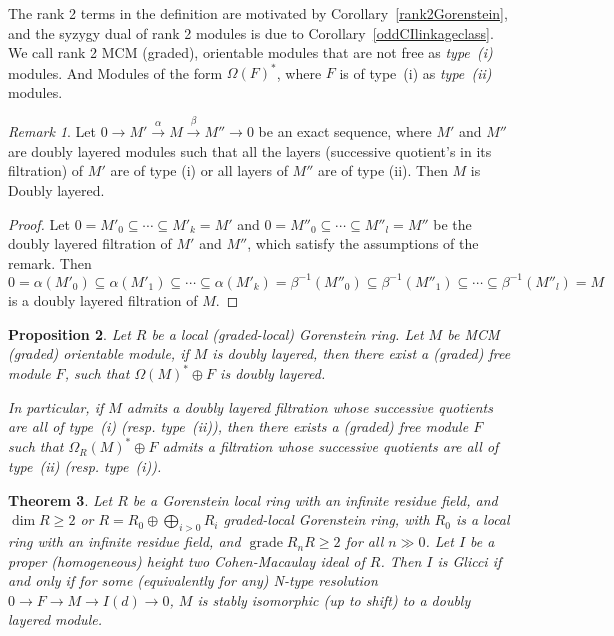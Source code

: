 \documentclass[11pt,letterpaper]{amsart}
\newcommand{\seq}{\subseteq}
\newcommand{\x}{\xrightarrow{}}
\DeclareMathOperator{\gr}{grade}
\theoremstyle{plain}
\newtheorem{thm}{Theorem}[section]
\newtheorem{prop}[thm]{Proposition}
\theoremstyle{definition}
\theoremstyle{remark}
\newtheorem{remark}[thm]{Remark}
\begin{document}
The rank 2 terms in the definition are motivated by Corollary~\ref{rank2Gorenstein}, and the syzygy dual of rank 2 modules is due to Corollary~\ref{oddCIlinkageclass}. We call rank 2 MCM (graded), orientable modules that are not free as \emph{type~(i)} modules. And Modules of the form $\Omega(F)^*$, where $F$ is of type~(i) as \emph{type~(ii)} modules. 

\begin{remark}

    Let $0\xrightarrow{} M'\xrightarrow{\alpha} M\xrightarrow{\beta} M''\x 0$ be an exact sequence, where $M'$ and $M''$ are doubly layered modules such that all the layers (successive quotient's in its filtration) of $M'$ are of type (i) or all layers of $M''$ are of type (ii). Then $M$ is Doubly layered.

\end{remark} 
\begin{proof} Let $0=M'_0\seq\cdots\seq M'_k=M'$ and $0=M''_0\seq\cdots\seq M''_l=M''$ be the doubly layered filtration of $M'$ and $M''$, which satisfy the assumptions of the remark. Then $$0=\alpha(M'_0)\seq \alpha(M'_1)\seq\cdots\seq \alpha(M'_k)=\beta^{-1}(M''_0)\seq \beta^{-1}(M''_1)\seq\cdots\seq\beta^{-1}(M''_l)=M$$ is a doubly layered filtration of $M$.
\end{proof}


\begin{prop}\cite[Proposition~4.5]{CasanellasDrozdHartshorne+2005+149+171}\label{Omega(M)^*isDL}
    Let $R$ be a local (graded-local) Gorenstein ring. Let $M$ be MCM (graded) orientable module, if $M$ is doubly layered, then there exist a (graded) free module $F$, such that $\Omega(M)^*\oplus F$ is doubly layered.

In particular, if $M$ admits a doubly layered filtration whose successive quotients are all of type~(i) (resp. type~(ii)), then there exists a (graded) free
module $F$ such that $\Omega_R(M)^*\oplus F$ admits
a filtration whose successive quotients are all
of type~(ii) (resp. type~(i)).
\end{prop}

\begin{thm}\label{DLstablyGlicci}\cite[Corollary~5.3]{CasanellasDrozdHartshorne+2005+149+171}
    Let $R$ be a Gorenstein local ring with an infinite residue field, and $\dim R\ge 2$ or $R=R_0\oplus\bigoplus_{i>0} R_i$ graded-local Gorenstein ring, with $R_0$ is a local ring with an infinite residue field, and $\gr R_nR\ge 2$ for all $n\gg 0$. Let $I$ be a proper (homogeneous) height two Cohen-Macaulay ideal of $R$. Then $I$ is Glicci if and only if for some (equivalently for any) N-type resolution $0\x F\x M\x I(d)\x 0$, $M$ is stably isomorphic (up to shift) to a doubly layered module.  
\end{thm}
\end{document}
